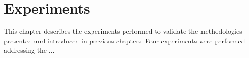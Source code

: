 \chapter{ Experiments }

This chapter describes the experiments performed to validate the methodologies presented and introduced in previous chapters. Four experiments were performed addressing the ...

